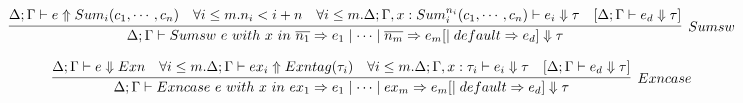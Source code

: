 \documentclass{article}
\begin{document}
$$
\infer[Sumsw]{\Delta; \Gamma \vdash \Sumsw{e}{x}{\overline{n_1} \Rightarrow e_1 \mid \cdots \mid \overline{n_m} \Rightarrow e_m [\mid default \Rightarrow e_d] \Downarrow \tau}}
{
	\Delta; \Gamma \vdash e \Uparrow \Sum{i}{c_1,\cdots,c_n}
	\quad \forall i \leq m . n_i < i+n
	\quad \forall i \leq m . \Delta; \Gamma, x: \KSum{i}{c_1,\cdots,c_n}{n_i} \vdash e_i \Downarrow \tau
	\quad [\Delta; \Gamma \vdash e_d \Downarrow \tau]
}
$$

$$
\infer[Exncase]{\Delta; \Gamma \vdash \Exncase{e}{x}{ex_1 \Rightarrow e_1 \mid \cdots \mid ex_m \Rightarrow e_m [\mid default \Rightarrow e_d] \Downarrow \tau}}
{
	\Delta; \Gamma \vdash e \Downarrow \Exn
	\quad \forall i \leq m . \Delta; \Gamma \vdash ex_i \Uparrow \Exntag{\tau_i}
	\quad \forall i \leq m . \Delta; \Gamma, x: \tau_i \vdash e_i \Downarrow \tau
	\quad [\Delta; \Gamma \vdash e_d \Downarrow \tau]
}
$$
\end{document}
